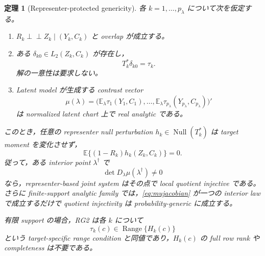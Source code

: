 \documentclass[11pt,a4paper]{ltjsarticle}
\newtheorem{theorem}{定理}[section]
\theoremstyle{remark}
\newcommand{\E}{\mathbb E}
\newcommand{\ind}{\perp\!\!\!\perp}
\newcommand{\Null}{\operatorname{Null}}
\newcommand{\Range}{\operatorname{Range}}
\begin{document}
\begin{theorem}[Representer-protected genericity]\label{thm:representergeneric}
各 $k=1,\ldots,p_\lambda$ について次を仮定する。
\begin{enumerate}[label=(RG\arabic*)]
\item $R_k\ind Z_k\mid(Y_k,C_k)$ と overlap が成立する。
\item ある $\delta_{k0}\in L_2(Z_k,C_k)$ が存在し，
\begin{equation}
T_k^*\delta_{k0}=\tau_k.
\label{eq:repRG}
\end{equation}
解の一意性は要求しない。
\item Latent model が生成する contrast vector
\begin{equation}
\mu(\lambda)
=\bigl(\E_\lambda\tau_1(Y_1,C_1),\ldots,
\E_\lambda\tau_{p_\lambda}(Y_{p_\lambda},C_{p_\lambda})\bigr)'
\label{eq:mulambda}
\end{equation}
は normalized latent chart 上で real analytic である。
\end{enumerate}
このとき，任意の representer null perturbation $h_k\in\Null(T_k^*)$ は target moment を変化させず，
\begin{equation}
\E\{(1-R_k)h_k(Z_k,C_k)\}=0.
\label{eq:repnullprotected}
\end{equation}
従って，ある interior point $\lambda^\dagger$ で
\begin{equation}
\det D_\lambda\mu(\lambda^\dagger)\neq0
\label{eq:mujacobian}
\end{equation}
なら，representer-based joint system はその点で local quotient injective である。さらに finite-support analytic family では，\eqref{eq:mujacobian} が一つの interior law で成立するだけで quotient injectivity は probability-generic に成立する。

有限 support の場合，RG2 は各 $k$ について
\begin{equation}
\tau_k(c)\in\Range\{H_k(c)\}
\label{eq:RGfiniterange}
\end{equation}
という target-specific range condition と同値であり，$H_k(c)$ の full row rank や completeness は不要である。
\end{theorem}
\end{document}
